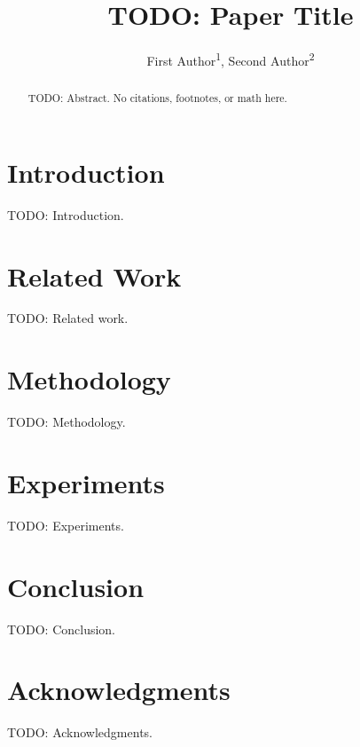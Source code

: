 \documentclass[letterpaper]{article}
\title{TODO: Paper Title}
\author{
    First Author\textsuperscript{\rm 1},
    Second Author\textsuperscript{\rm 2}
}
\begin{document}
\maketitle

\begin{abstract}
TODO: Abstract. No citations, footnotes, or math here.
\end{abstract}


\section{Introduction}
\label{sec:intro}
TODO: Introduction.

\section{Related Work}
\label{sec:related}
TODO: Related work.

\section{Methodology}
\label{sec:methodology}
TODO: Methodology.

\section{Experiments}
\label{sec:experiments}
TODO: Experiments.

\section{Conclusion}
\label{sec:conclusion}
TODO: Conclusion.

\section*{Acknowledgments}
TODO: Acknowledgments.


\end{document}
